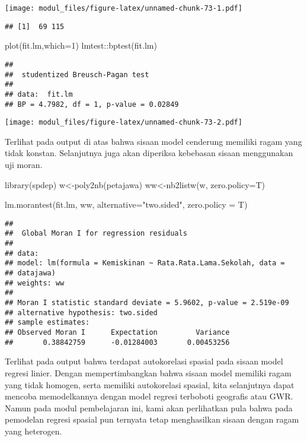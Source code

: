 \documentclass[
]{book}
\newenvironment{Shaded}{\begin{snugshade}}{\end{snugshade}}
\newcommand{\AttributeTok}[1]{\textcolor[rgb]{0.77,0.63,0.00}{#1}}
\newcommand{\DecValTok}[1]{\textcolor[rgb]{0.00,0.00,0.81}{#1}}
\newcommand{\FunctionTok}[1]{\textcolor[rgb]{0.00,0.00,0.00}{#1}}
\newcommand{\NormalTok}[1]{#1}
\newcommand{\OtherTok}[1]{\textcolor[rgb]{0.56,0.35,0.01}{#1}}
\newcommand{\SpecialCharTok}[1]{\textcolor[rgb]{0.00,0.00,0.00}{#1}}
\newcommand{\StringTok}[1]{\textcolor[rgb]{0.31,0.60,0.02}{#1}}
\begin{document}
\texttt{[image: modul\_files/figure-latex/unnamed-chunk-73-1.pdf]}

\begin{verbatim}
## [1]  69 115
\end{verbatim}

\begin{Shaded}
\begin{Highlighting}[]
\FunctionTok{plot}\NormalTok{(fit.lm,}\AttributeTok{which=}\DecValTok{1}\NormalTok{)}
\NormalTok{lmtest}\SpecialCharTok{::}\FunctionTok{bptest}\NormalTok{(fit.lm)}
\end{Highlighting}
\end{Shaded}

\begin{verbatim}
## 
##  studentized Breusch-Pagan test
## 
## data:  fit.lm
## BP = 4.7982, df = 1, p-value = 0.02849
\end{verbatim}

\texttt{[image: modul\_files/figure-latex/unnamed-chunk-73-2.pdf]}

Terlihat pada output di atas bahwa sisaan model cenderung memiliki ragam yang tidak konstan. Selanjutnya juga akan diperiksa kebebasan sisaan menggunakan uji moran.

\begin{Shaded}
\begin{Highlighting}[]
\FunctionTok{library}\NormalTok{(spdep)}
\NormalTok{w}\OtherTok{\textless{}{-}}\FunctionTok{poly2nb}\NormalTok{(petajawa)}
\NormalTok{ww}\OtherTok{\textless{}{-}}\FunctionTok{nb2listw}\NormalTok{(w, }\AttributeTok{zero.policy=}\NormalTok{T)}

\FunctionTok{lm.morantest}\NormalTok{(fit.lm, ww, }\AttributeTok{alternative=}\StringTok{"two.sided"}\NormalTok{, }\AttributeTok{zero.policy =}\NormalTok{ T)}
\end{Highlighting}
\end{Shaded}

\begin{verbatim}
## 
##  Global Moran I for regression residuals
## 
## data:  
## model: lm(formula = Kemiskinan ~ Rata.Rata.Lama.Sekolah, data =
## datajawa)
## weights: ww
## 
## Moran I statistic standard deviate = 5.9602, p-value = 2.519e-09
## alternative hypothesis: two.sided
## sample estimates:
## Observed Moran I      Expectation         Variance 
##       0.38842759      -0.01284003       0.00453256
\end{verbatim}

Terlihat pada output bahwa terdapat autokorelasi spasial pada sisaan model regresi linier. Dengan mempertimbangkan bahwa sisaan model memiliki ragam yang tidak homogen, serta memiliki autokorelasi spasial, kita selanjutnya dapat mencoba memodelkannya dengan model regresi terboboti geografis atau GWR. Namun pada modul pembelajaran ini, kami akan perlihatkan pula bahwa pada pemodelan regresi spasial pun ternyata tetap menghasilkan sisaan dengan ragam yang heterogen.
\end{document}
